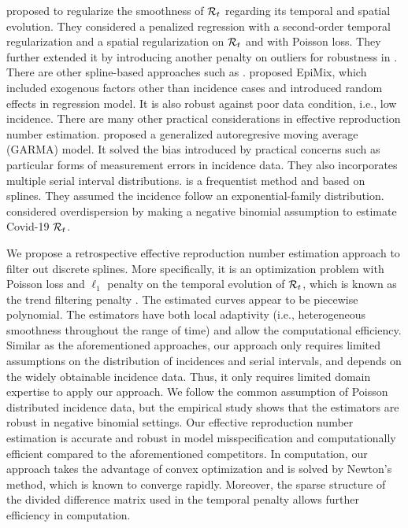 \cite{abry2020spatial} proposed to regularize the smoothness of $\mathcal{R}_t$ regarding its temporal and spatial evolution. They considered a penalized regression with a second-order temporal regularization and a spatial regularization on $\mathcal{R}_t$ and with Poisson loss. They further extended it by introducing another penalty on outliers for robustness in \cite{pascal2022nonsmooth}. 
%
There are other spline-based approaches such as \cite{azmon2014estimation,gressani2021approximate,pircalabelu2023spline}. %
\cite{jin2023epimix} proposed EpiMix, which included exogenous factors other than incidence cases and introduced random effects in regression model. It is also robust against poor data condition, i.e., low incidence. 
%
There are many other practical considerations in effective reproduction number estimation. \cite{hettinger2023estimating} proposed a generalized autoregresive moving average (GARMA) model. It solved the bias introduced by practical concerns such as particular forms of measurement errors in incidence data. They also incorporates multiple serial interval distributions. %
%
\cite{pircal2023spline} is a frequentist method and based on splines. They assumed the incidence follow an exponential-family distribution. %
\cite{ho2023accounting} considered overdispersion by making a negative binomial assumption to estimate Covid-19 $\mathcal{R}_t$. 

We propose a retrospective effective reproduction number estimation approach to filter out discrete splines. More specifically, it is an optimization problem with Poisson loss and $\ell_1$ penalty on the temporal evolution of $\mathcal{R}_t$, which is known as the trend filtering penalty \citep{kim2009ell_1,tibshirani2014adaptive}. The estimated curves appear to be piecewise polynomial. The estimators have both local adaptivity (i.e., heterogeneous smoothness throughout the range of time) and allow the computational efficiency. Similar as the aforementioned approaches, our approach only requires limited assumptions on the distribution of incidences and serial intervals, and depends on the widely obtainable incidence data. Thus, it only requires limited domain expertise to apply our approach. We follow the common assumption of Poisson distributed incidence data, but the empirical study shows that the estimators are robust in negative binomial settings. 
Our effective reproduction number estimation is accurate and robust in model misspecification and computationally efficient compared to the aforementioned competitors. 
In computation, our approach takes the advantage of convex optimization and is solved by Newton's method, which is known to converge rapidly. Moreover, the sparse structure of the divided difference matrix used in the temporal penalty allows further efficiency in computation. 

